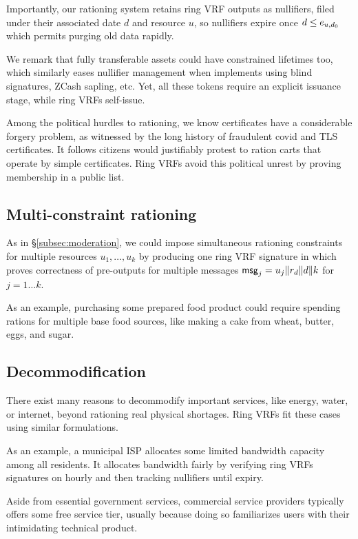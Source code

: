 Importantly, our rationing system retains ring VRF outputs as nullifiers,
filed under their associated date $d$ and resource $u$, so nullifiers
expire once $d \le e_{u,d_0}$ which permits purging old data rapidly.

We remark that fully transferable assets could have constrained lifetimes
too, which similarly eases nullifier management when implements using
blind signatures, ZCash sapling, etc.  Yet, all these tokens require
an explicit issuance stage, while ring VRFs self-issue.

Among the political hurdles to rationing, we know certificates have
a considerable forgery problem, as witnessed by the long history of
fraudulent covid and TLS certificates.  It follows citizens would
justifiably protest to ration carts that operate by simple certificates.
Ring VRFs avoid this political unrest by proving membership in a public list.


\subsection{Multi-constraint rationing}

As in \S\ref{subsec:moderation}, we could impose simultaneous rationing
constraints for multiple resources $u_1,\ldots,u_k$ by producing one
ring VRF signature in which \PedVRF proves correctness of pre-outputs
for multiple messages 
 $\mathsf{msg}_j = u_j \| r_d \| d \| k$ for $j=1 \ldots k$.

As an example, purchasing some prepared food product could require spending
rations for multiple base food sources, like making a cake from wheat, butter,
eggs, and sugar.  


\subsection{Decommodification}

There exist many reasons to decommodify important services, like
energy, water, or internet, beyond rationing real physical shortages.
Ring VRFs fit these cases using similar \msg formulations.

As an example, a municipal ISP allocates some limited bandwidth capacity
among all residents.  It allocates bandwidth fairly by verifying ring VRFs
signatures on hourly \msg and then tracking nullifiers until expiry.

Aside from essential government services, commercial service providers
typically offers some free service tier, usually because doing so
familiarizes users with their intimidating technical product.

